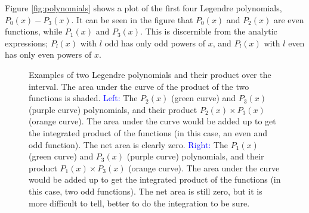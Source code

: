\documentclass[12pt]{article}
\begin{document}
\begin{flushleft}
Figure \ref{fig:polynomials} shows a plot of the first four Legendre polynomials, $P_{0}(x)-P_{3}(x)$.  It can be seen in the figure that $P_{0}(x)$ and $P_{2}(x)$ are even functions, while $P_{1}(x)$ and $P_{3}(x)$.  This is discernible from the analytic expressions; $P_{l}(x)$ with $l$ odd has only odd powers of $x$, and $P_{l}(x)$ with $l$ even has only even powers of $x$.

\begin{figure}[h]
\begin{center}
\hspace{0.2in}
\end{center}
\caption{\small Examples of two Legendre polynomials and their product over the interval.  The area under the curve of the product of the two functions is shaded.  \textcolor{blue} {Left:} The $P_{2}(x)$ (green curve) and $P_{3}(x)$ (purple curve) polynomials, and their product $P_{2}(x) \times P_{3}(x)$ (orange curve).  The area under the curve would be added up to get the integrated  product of the functions (in this case, an even and odd function).  The net area is clearly zero.  \textcolor{blue} {Right:} The $P_{1}(x)$ (green curve) and $P_{3}(x)$ (purple curve) polynomials, and their product $P_{1}(x) \times P_{3}(x)$ (orange curve).  The area under the curve would be added up to get the integrated  product of the functions (in this case, two odd functions).  The net area is still zero, but it is more difficult to tell, better to do the integration to be sure.}
\label{fig:polyproducts}
\end{figure}


\end{flushleft}
\end{document}
